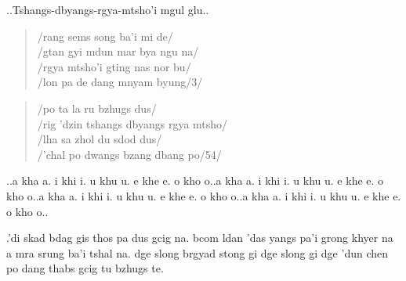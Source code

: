 \documentclass[a4paper,parskip,12pt]{scrarticle}
\begin{document}
\begin{otherlanguage}{wylie}
  ..Tshangs-dbyangs-rgya-mtsho'i mgul glu..

  \begin{verse}
    /rang sems song ba'i mi de/\\
    /gtan gyi mdun mar bya ngu na/\\
    /rgya mtsho'i gting nas nor bu/\\
    /lon pa de dang mnyam byung/3/
  \end{verse}

  \begin{verse}
    /po ta la ru bzhugs dus/\\
    /rig 'dzin tshangs dbyangs rgya mtsho/\\
    /lha sa zhol du sdod dus/\\
    /'chal po dwangs bzang dbang po/54/
  \end{verse}

  \bigskip

  ..a kha a. i khi i. u khu u. e khe e. o kho o..a kha a. i khi i. u khu u. e khe e. o kho o..a kha a. i khi i. u khu u. e khe e. o kho o..a kha a. i khi i. u khu u. e khe e. o kho o..
  
  .’di skad bdag gis thos pa dus gcig na.
  bcom ldan ’das yangs pa’i grong khyer na a mra srung ba’i tshal na.
  dge slong brgyad stong gi dge slong gi dge ’dun chen po dang thabs gcig tu bzhugs te.

  
\end{otherlanguage}
\end{document}
